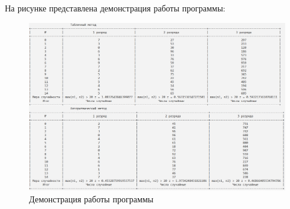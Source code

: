 На рисунке представлена демонстрация работы программы:

\captionsetup{justification=centering}
\begin{figure}[H]
	\includegraphics[width=\linewidth]{inc/demo}
	\centering
	\caption{Демонстрация работы программы}
\end{figure}


